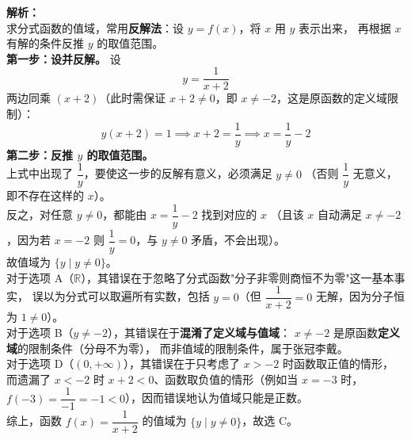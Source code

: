 \documentclass[12pt,a4paper]{exam-zh}
\begin{document}
\begin{solution}
    \textbf{解析：} \\
    求分式函数的值域，常用\textbf{反解法}：设 $y = f(x)$，将 $x$ 用 $y$ 表示出来，
    再根据 $x$ 有解的条件反推 $y$ 的取值范围。 \\[4pt]
    \textbf{第一步：设并反解。} 设
    \[ \displaystyle y = \frac{1}{x+2} \]
    两边同乘 $(x+2)$（此时需保证 $x+2 \neq 0$，即 $x \neq -2$，这是原函数的定义域限制）：
    \[ \displaystyle y(x+2) = 1 \implies x + 2 = \frac{1}{y} \implies x = \frac{1}{y} - 2 \]
    \textbf{第二步：反推 $y$ 的取值范围。} \\
    上式中出现了 $\dfrac{1}{y}$，要使这一步的反解有意义，必须满足 $y \neq 0$
    （否则 $\dfrac{1}{y}$ 无意义，即不存在这样的 $x$）。 \\
    反之，对任意 $y \neq 0$，都能由 $x = \dfrac{1}{y} - 2$ 找到对应的 $x$
    （且该 $x$ 自动满足 $x \neq -2$，因为若 $x=-2$ 则 $\dfrac{1}{y}=0$，与 $y\neq0$ 矛盾，不会出现）。 \\
    故值域为 $\{y \mid y \neq 0\}$。 \\[4pt]
    对于选项 A（$\mathbb{R}$），其错误在于忽略了分式函数"分子非零则商恒不为零"这一基本事实，
    误以为分式可以取遍所有实数，包括 $y=0$（但 $\dfrac{1}{x+2}=0$ 无解，因为分子恒为 $1 \neq 0$）。 \\
    对于选项 B（$y \neq -2$），其错误在于\textbf{混淆了定义域与值域}：
    $x \neq -2$ 是原函数\textbf{定义域}的限制条件（分母不为零），
    而非值域的限制条件，属于张冠李戴。 \\
    对于选项 D（$(0,+\infty)$），其错误在于只考虑了 $x > -2$ 时函数取正值的情形，
    而遗漏了 $x < -2$ 时 $x+2 < 0$、函数取负值的情形（例如当 $x=-3$ 时，
    $f(-3) = \dfrac{1}{-1} = -1 < 0$），因而错误地认为值域只能是正数。 \\[4pt]
    综上，函数 $f(x)=\dfrac{1}{x+2}$ 的值域为 $\{y \mid y \neq 0\}$，故选 C。
\end{solution}
\end{document}
